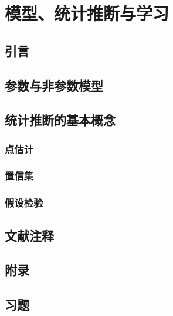 \chapter{模型、统计推断与学习}

\section{引言}

\pending

\section{参数与非参数模型}

\pending

\section{统计推断的基本概念}

\subsection{点估计}

\pending


\subsection{置信集}

\pending


\subsection{假设检验}

\pending

\section{文献注释}

\pending

\section{附录}

\pending

\section{习题}

\pending
